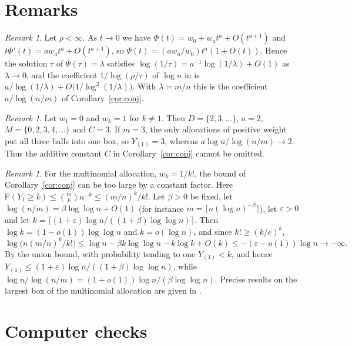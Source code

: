 \documentclass[11pt]{amsart}
\theoremstyle{remark}
\newtheorem{remark}[theorem]{Remark}
\numberwithin{equation}{section}
\newcommand{\Pp}{\mathbb P}
\begin{document}
\section{Remarks}\label{sec:remarks}

\begin{remark}\label{rem:janson}
Let $\rho<\infty$. As $t\to0$ we have $\Phi(t)=w_0+w_at^a+O(t^{a+1})$ and $t\Phi'(t)=aw_at^a+O(t^{a+1})$, so $\Psi(t)=(aw_a/w_0)t^a(1+O(t))$. Hence the solution $\tau$ of $\Psi(\tau)=\lambda$ satisfies $\log(1/\tau)=a^{-1}\log(1/\lambda)+O(1)$ as $\lambda\to0$, and the coefficient $1/\log(\rho/\tau)$ of $\log n$ in \cite[Theorem~19.3]{J12} is $a/\log(1/\lambda)+O\bigl(1/\log^2(1/\lambda)\bigr)$. With $\lambda=m/n$ this is the coefficient $a/\log(n/m)$ of Corollary~\ref{cor:conj}.
\end{remark}

\begin{remark}\label{rem:C}
Let $w_1=0$ and $w_k=1$ for $k\ne1$. Then $D=\{2,3,\dots\}$, $a=2$, $M=\{0,2,3,4,\dots\}$ and $C=3$. If $m=3$, the only allocations of positive weight put all three balls into one box, so $Y_{(1)}=3$, whereas $a\log n/\log(n/m)\to2$. Thus the additive constant $C$ in Corollary~\ref{cor:conj} cannot be omitted.
\end{remark}

\begin{remark}\label{rem:multinomial}
For the multinomial allocation, $w_k=1/k!$, the bound of Corollary~\ref{cor:conj} can be too large by a constant factor. Here $\Pp(Y_1\ge k)\le\binom mkn^{-k}\le(m/n)^k/k!$. Let $\beta>0$ be fixed, let $\log(n/m)=\beta\log\log n+O(1)$ (for instance $m=\lceil n(\log n)^{-\beta}\rceil$), let $\varepsilon>0$ and let $k=\lceil(1+\varepsilon)\log n/((1+\beta)\log\log n)\rceil$. Then $\log k=(1-o(1))\log\log n$ and $k=o(\log n)$, and since $k!\ge(k/e)^k$,
\[
\log\bigl(n(m/n)^k/k!\bigr)\le\log n-\beta k\log\log n-k\log k+O(k)\le-(\varepsilon-o(1))\log n\to-\infty .
\]
By the union bound, with probability tending to one $Y_{(1)}<k$, and hence $Y_{(1)}\le(1+\varepsilon)\log n/((1+\beta)\log\log n)$, while $\log n/\log(n/m)=(1+o(1))\log n/(\beta\log\log n)$. Precise results on the largest box of the multinomial allocation are given in \cite{KSC78,RS98}.
\end{remark}

\section{Computer checks}\label{sec:checks}
\end{document}
